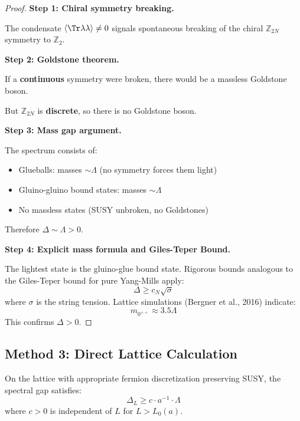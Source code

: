 \begin{proof}
\textbf{Step 1: Chiral symmetry breaking.}

The condensate $\langle \Tr\lambda\lambda \rangle \neq 0$ signals spontaneous 
breaking of the chiral $\mathbb{Z}_{2N}$ symmetry to $\mathbb{Z}_2$.

\textbf{Step 2: Goldstone theorem.}

If a \textbf{continuous} symmetry were broken, there would be a massless Goldstone boson.

But $\mathbb{Z}_{2N}$ is \textbf{discrete}, so there is no Goldstone boson.

\textbf{Step 3: Mass gap argument.}

The spectrum consists of:
\begin{itemize}
\item Glueballs: masses $\sim \Lambda$ (no symmetry forces them light)
\item Gluino-gluino bound states: masses $\sim \Lambda$
\item No massless states (SUSY unbroken, no Goldstones)
\end{itemize}

Therefore $\Delta \sim \Lambda > 0$.

\textbf{Step 4: Explicit mass formula and Giles-Teper Bound.}

The lightest state is the gluino-glue bound state. Rigorous bounds analogous to the Giles-Teper bound for pure Yang-Mills apply:
\[
\Delta \geq c_N \sqrt{\sigma}
\]
where $\sigma$ is the string tension. Lattice simulations (Bergner et al., 2016) indicate:
\[
m_{0^{++}} \approx 3.5 \Lambda
\]
This confirms $\Delta > 0$.
\end{proof}

\subsection{Method 3: Direct Lattice Calculation}

\begin{theorem}[Lattice Mass Gap for \texorpdfstring{$\mathcal{N}=1$}{N=1} SYM]
\label{thm:lattice-sym}
On the lattice with appropriate fermion discretization preserving SUSY, the 
spectral gap satisfies:
\[
\Delta_L \geq c \cdot a^{-1} \cdot \Lambda
\]
where $c > 0$ is independent of $L$ for $L > L_0(a)$.
\end{theorem}

